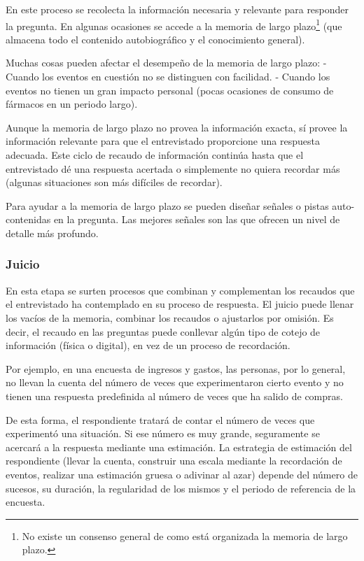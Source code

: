 \documentclass[
  10pt,
  spanish,
]{book}
\begin{document}
En este proceso se recolecta la información necesaria y relevante para responder la pregunta. En algunas ocasiones se accede a la memoria de largo plazo\footnote{No existe un consenso general de como está organizada la memoria de largo plazo.} (que almacena todo el contenido autobiográfico y el conocimiento general).

Muchas cosas pueden afectar el desempeño de la memoria de largo plazo:
- Cuando los eventos en cuestión no se distinguen con facilidad.
- Cuando los eventos no tienen un gran impacto personal (pocas ocasiones de consumo de fármacos en un periodo largo).

Aunque la memoria de largo plazo no provea la información exacta, sí provee la información relevante para que el entrevistado proporcione una respuesta adecuada. Este ciclo de recaudo de información continúa hasta que el entrevistado dé una respuesta acertada o simplemente no quiera recordar más (algunas situaciones son más difíciles de recordar).

Para ayudar a la memoria de largo plazo se pueden diseñar señales o pistas auto-contenidas en la pregunta. Las mejores señales son las que ofrecen un nivel de detalle más profundo.

\hypertarget{juicio}{%
\subsubsection*{Juicio}\label{juicio}}

En esta etapa se surten procesos que combinan y complementan los recaudos que el entrevistado ha contemplado en su proceso de respuesta. El juicio puede llenar los vacíos de la memoria, combinar los recaudos o ajustarlos por omisión. Es decir, el recaudo en las preguntas puede conllevar algún tipo de cotejo de información (física o digital), en vez de un proceso de recordación.

Por ejemplo, en una encuesta de ingresos y gastos, las personas, por lo general, no llevan la cuenta del número de veces que experimentaron cierto evento y no tienen una respuesta predefinida al número de veces que ha salido de compras.

De esta forma, el respondiente tratará de contar el número de veces que experimentó una situación. Si ese número es muy grande, seguramente se acercará a la respuesta mediante una estimación. La estrategia de estimación del respondiente (llevar la cuenta, construir una escala mediante la recordación de eventos, realizar una estimación gruesa o adivinar al azar) depende del número de sucesos, su duración, la regularidad de los mismos y el periodo de referencia de la encuesta.
\end{document}
